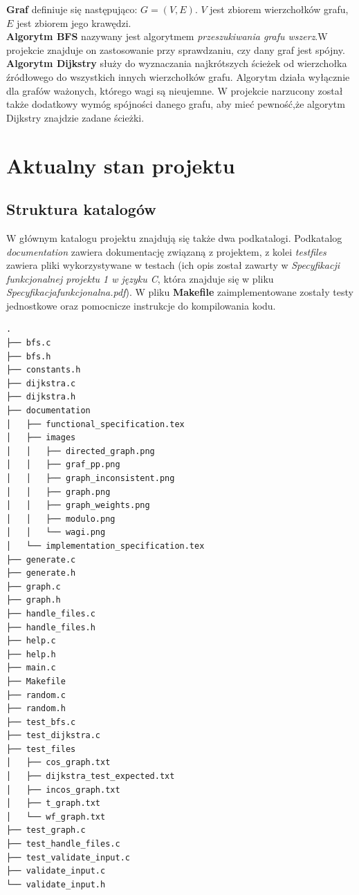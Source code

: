 \documentclass{article}
\begin{document}
\textbf{Graf} definiuje się następująco: $G=(V,E)$. $V$ jest zbiorem wierzchołków grafu, $E$ jest zbiorem jego krawędzi.
\vspace{5mm}
\\
\textbf{Algorytm BFS} nazywany jest algorytmem \emph{przeszukiwania grafu wszerz}.\linebreak W projekcie znajduje on zastosowanie przy sprawdzaniu, czy dany graf jest spójny.
\vspace{5mm}
\\
\textbf{Algorytm Dijkstry} służy do wyznaczania najkrótszych ścieżek od wierzchołka źródłowego do wszystkich innych wierzchołków grafu. Algorytm działa wyłącznie dla grafów ważonych, którego wagi są nieujemne. W projekcie narzucony został także dodatkowy wymóg spójności danego grafu, aby mieć pewność,\linebreak że algorytm Dijkstry znajdzie zadane ścieżki.
\section{Aktualny stan projektu}
\subsection{Struktura katalogów}

W głównym katalogu projektu znajdują się także dwa podkatalogi. Podkatalog \emph{documentation} zawiera dokumentację związaną z projektem, z kolei \emph{test\textunderscore files} zawiera pliki wykorzystywane w testach (ich opis został zawarty w \emph{Specyfikacji funkcjonalnej projektu 1 w języku C}, która znajduje się w pliku \emph{Specyfikacja\textunderscore funkcjonalna.pdf}). W pliku \textbf{Makefile} zaimplementowane zostały testy jednostkowe oraz pomocnicze instrukcje do kompilowania kodu.


\begin{lstlisting}[style=tree]
.
├── bfs.c
├── bfs.h
├── constants.h
├── dijkstra.c
├── dijkstra.h
├── documentation
│   ├── functional_specification.tex
│   ├── images
│   │   ├── directed_graph.png
│   │   ├── graf_pp.png
│   │   ├── graph_inconsistent.png
│   │   ├── graph.png
│   │   ├── graph_weights.png
│   │   ├── modulo.png
│   │   └── wagi.png
│   └── implementation_specification.tex
├── generate.c
├── generate.h
├── graph.c
├── graph.h
├── handle_files.c
├── handle_files.h
├── help.c
├── help.h
├── main.c
├── Makefile
├── random.c
├── random.h
├── test_bfs.c
├── test_dijkstra.c
├── test_files
│   ├── cos_graph.txt
│   ├── dijkstra_test_expected.txt
│   ├── incos_graph.txt
│   ├── t_graph.txt
│   └── wf_graph.txt
├── test_graph.c
├── test_handle_files.c
├── test_validate_input.c
├── validate_input.c
└── validate_input.h
\end{lstlisting}
\end{document}
